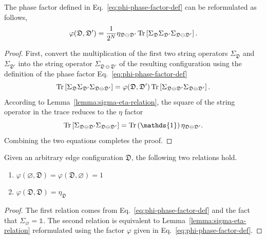 \begin{theorem}\label{thm:phi-operational-def}
The phase factor defined in Eq.~\eqref{eq:phi-phase-factor-def} can be reformulated as follows,
\[
\varphi(\mathfrak{D},\mathfrak{D}') = \frac{1}{2^{N}}\eta_{\mathfrak{D}\ominus\mathfrak{D}'}\Tr\left[ \Sigma_{\mathfrak{D}}\Sigma_{\mathfrak{D}'}\Sigma_{\mathfrak{D}\ominus\mathfrak{D}'} \right].
\]
\end{theorem}
\begin{proof}
First, convert the multiplication of the first two string operators $\Sigma_\mathfrak{D}$ and $\Sigma_{\mathfrak{D}'}$ into the string operator $\Sigma_{\mathfrak{D}\ominus\mathfrak{D}'}$ of the resulting configuration using the definition of the phase factor Eq.~\eqref{eq:phi-phase-factor-def}
\[
\Tr\left[ \Sigma_{\mathfrak{D}}\Sigma_{\mathfrak{D}'}\Sigma_{\mathfrak{D}\ominus\mathfrak{D}'} \right]
= \varphi(\mathfrak{D},\mathfrak{D}')\Tr\left[ \Sigma_{\mathfrak{D}\ominus\mathfrak{D}'}\Sigma_{\mathfrak{D}\ominus\mathfrak{D}'} \right].
\]
According to Lemma~\ref{lemma:sigma-eta-relation}, the square of the string operator in the trace reduces to the $\eta$ factor
\[
\Tr\lrm{\Sigma_{\mathfrak{D}\ominus\mathfrak{D}'}\Sigma_{\mathfrak{D}\ominus\mathfrak{D}'}}
=
\Tr\lr{\mathds{1}}\eta_{\mathfrak{D}\ominus\mathfrak{D}'}.
\]
Combining the two equations completes the proof.
\end{proof}

\begin{lemma}\label{thm:phi-self}
 Given an arbitrary edge configuration $\mathfrak{D}$, the following two relations hold.
 
\begin{enumerate}
    \item [(i)] $\varphi(\varnothing, \mathfrak{D}) = \varphi(\mathfrak{D},\varnothing)= 1$
    \item [(ii)] $\varphi(\mathfrak{D},\mathfrak{D}) = \eta_{\mathfrak{D}}$
\end{enumerate}
\begin{proof}
    The first relation comes from Eq.~\eqref{eq:phi-phase-factor-def} and the fact that $\Sigma_\varnothing = \mathds{1}$. The second relation is equivalent to Lemma~\ref{lemma:sigma-eta-relation} reformulated using the factor $\varphi$ given in Eq.~\eqref{eq:phi-phase-factor-def}.
\end{proof}
\end{lemma}

